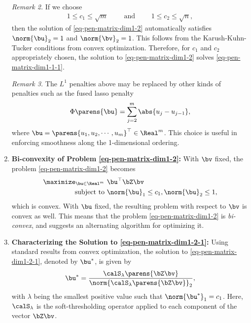 \documentclass[12pt]{article}
\begin{document}
\begin{enumerate}[label=\textbf{\arabic*.}]
	\textit{Remark 2.} If we choose 
	\begin{align*}
		1 \le c_1 \le \sqrt{m} \qquad \text{ and } \qquad 1 \le c_2 \le \sqrt{n}, 
	\end{align*}
	then the solution of \eqref{eq-pen-matrix-dim1-2} automatically satisfies $\norm{\bu}_2 = 1$ and $\norm{\bv}_2 = 1$. This follows from the Karush-Kuhn-Tucker conditions from convex optimization. Therefore, for $c_1$ and $c_2$ appropriately chosen, the solution to \eqref{eq-pen-matrix-dim1-2} solves \eqref{eq-pen-matrix-dim1-1-1}. 
	
	\textit{Remark 3.} The $L^1$ penalties above may be replaced by other kinds of penalties such as the fused lasso penalty 
	\begin{align*}
		\Phi \parens{\bu} = \sum_{j=2}^m \abs{u_j - u_{j-1}}, 
	\end{align*}
	where $\bu = \parens{u_1, u_2, \cdots, u_m}^\top \in \Real^m$. This choice is useful in enforcing smoothness along the 1-dimensional ordering. 
	
	\item \textbf{Bi-convexity of Problem \eqref{eq-pen-matrix-dim1-2}:} With $\bv$ fixed, the problem \eqref{eq-pen-matrix-dim1-2} becomes 
	\begin{equation}\label{eq-pen-matrix-dim1-2-1}
		\begin{aligned}
			\maximize_{\bu \in \Real^m} & \ \bu^\top \bZ \bv \\ 
			\text{subject to} & \ \norm{\bu}_1 \le c_1, \norm{\bu}_2 \le 1, 
		\end{aligned}
	\end{equation}
	which is convex. With $\bu$ fixed, the resulting problem with respect to $\bv$ is convex as well. This means that the problem \eqref{eq-pen-matrix-dim1-2} is \emph{bi-convex}, and suggests an alternating algorithm for optimizing it. 
	
	\item \textbf{Characterizing the Solution to \eqref{eq-pen-matrix-dim1-2-1}:} Using standard results from convex optimization, the solution to \eqref{eq-pen-matrix-dim1-2-1}, denoted by $\bu^*$, is given by 
	\begin{align*}
		\bu^* = \frac{\calS_{\lambda} \parens{\bZ \bv}}{\norm{\calS_{\lambda} \parens{\bZ \bv}}_2}, 
	\end{align*}
	with $\lambda$ being the smallest positive value such that $\norm{\bu^*}_1 = c_1$. Here, $\calS_{\lambda}$ is the soft-thresholding operator applied to each component of the vector $\bZ \bv$. 
	

\end{enumerate}
\end{document}
